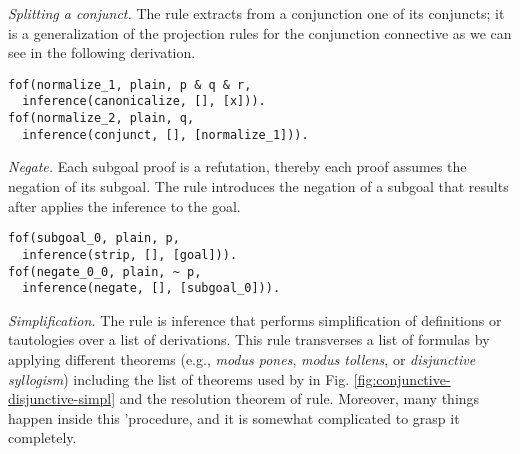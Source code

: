 \documentclass[../main.tex]{subfiles}
\begin{document}

\textit{Splitting a conjunct.} The \conjunct rule extracts from a
conjunction one of its conjuncts; it is a generalization of the
projection rules for the conjunction connective as we can see in the
following \TSTP derivation.

\begin{verbatim}
fof(normalize_1, plain, p & q & r,
  inference(canonicalize, [], [x])).
fof(normalize_2, plain, q,
  inference(conjunct, [], [normalize_1])).
\end{verbatim}

\textit{Negate.}
Each subgoal proof is a refutation, thereby each proof assumes
the negation of its subgoal. The \negate rule
introduces the negation of a subgoal that results
after applies the \strip inference to the goal.

\begin{verbatim}
fof(subgoal_0, plain, p,
  inference(strip, [], [goal])).
fof(negate_0_0, plain, ~ p,
  inference(negate, [], [subgoal_0])).
\end{verbatim}


\textit{Simplification.}
The \simplify rule is inference that performs simplification of 
definitions or tautologies over a list of derivations. This rule 
transverses a list of formulas by applying different theorems (e.g.,
\emph{modus pones}, \emph{modus tollens}, or \emph{disjunctive
syllogism}) including the list of theorems used by \canonicalize in Fig.
\ref{fig:conjunctive-disjunctive-simpl} and the resolution theorem of
\resolve rule. Moreover, many things happen inside this \Metis'procedure, 
and it is somewhat complicated to grasp it completely.
\end{document}
